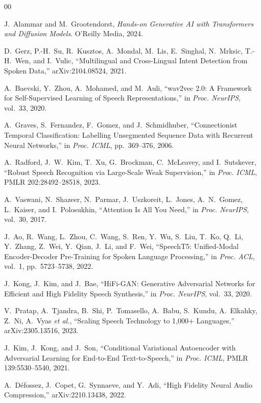 \documentclass[conference]{IEEEtran}
\begin{document}
\begin{thebibliography}{00}

 J.~Alammar and M.~Grootendorst, \textit{Hands-on Generative AI with Transformers and Diffusion Models}. O'Reilly Media, 2024.

 D.~Gerz, P.-H.~Su, R.~Kusztos, A.~Mondal, M.~Lis, E.~Singhal, N.~Mrksic, T.-H.~Wen, and I.~Vulic, ``Multilingual and Cross-Lingual Intent Detection from Spoken Data,'' arXiv:2104.08524, 2021.

 A.~Baevski, Y.~Zhou, A.~Mohamed, and M.~Auli, ``wav2vec 2.0: A Framework for Self-Supervised Learning of Speech Representations,'' in \textit{Proc. NeurIPS}, vol.~33, 2020.

 A.~Graves, S.~Fernandez, F.~Gomez, and J.~Schmidhuber, ``Connectionist Temporal Classification: Labelling Unsegmented Sequence Data with Recurrent Neural Networks,'' in \textit{Proc. ICML}, pp.~369--376, 2006.

 A.~Radford, J.~W.~Kim, T.~Xu, G.~Brockman, C.~McLeavey, and I.~Sutskever, ``Robust Speech Recognition via Large-Scale Weak Supervision,'' in \textit{Proc. ICML}, PMLR 202:28492--28518, 2023.

 A.~Vaswani, N.~Shazeer, N.~Parmar, J.~Uszkoreit, L.~Jones, A.~N.~Gomez, L.~Kaiser, and I.~Polosukhin, ``Attention Is All You Need,'' in \textit{Proc. NeurIPS}, vol.~30, 2017.

 J.~Ao, R.~Wang, L.~Zhou, C.~Wang, S.~Ren, Y.~Wu, S.~Liu, T.~Ko, Q.~Li, Y.~Zhang, Z.~Wei, Y.~Qian, J.~Li, and F.~Wei, ``SpeechT5: Unified-Modal Encoder-Decoder Pre-Training for Spoken Language Processing,'' in \textit{Proc. ACL}, vol.~1, pp.~5723--5738, 2022.

 J.~Kong, J.~Kim, and J.~Bae, ``HiFi-GAN: Generative Adversarial Networks for Efficient and High Fidelity Speech Synthesis,'' in \textit{Proc. NeurIPS}, vol.~33, 2020.

 V.~Pratap, A.~Tjandra, B.~Shi, P.~Tomasello, A.~Babu, S.~Kundu, A.~Elkahky, Z.~Ni, A.~Vyas \textit{et al.}, ``Scaling Speech Technology to 1,000+ Languages,'' arXiv:2305.13516, 2023.

 J.~Kim, J.~Kong, and J.~Son, ``Conditional Variational Autoencoder with Adversarial Learning for End-to-End Text-to-Speech,'' in \textit{Proc. ICML}, PMLR 139:5530--5540, 2021.

 A.~D\'{e}fossez, J.~Copet, G.~Synnaeve, and Y.~Adi, ``High Fidelity Neural Audio Compression,'' arXiv:2210.13438, 2022.

\end{thebibliography}

\end{document}
